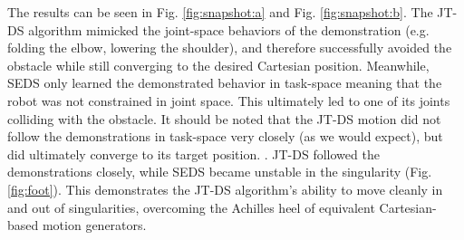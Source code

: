 \documentclass[letterpaper, 10 pt, conference,fleqn]{ieeeconf}
\begin{document}
The results can be seen in Fig. \ref{fig:snapshot:a} and Fig. \ref{fig:snapshot:b}. The JT-DS algorithm mimicked the joint-space behaviors of the demonstration (e.g. folding the elbow, lowering the shoulder), and therefore successfully avoided the obstacle while still converging to the desired Cartesian position. Meanwhile, SEDS only learned the demonstrated behavior in task-space meaning that the robot was not constrained in joint space. This ultimately led to one of its joints colliding with the obstacle. It should be noted that the JT-DS motion did not follow the demonstrations in task-space very closely (as we would expect), but did ultimately converge to its target position.
. JT-DS followed the demonstrations closely, while SEDS became unstable in the singularity (Fig. \ref{fig:foot}). This demonstrates the JT-DS algorithm's ability to move cleanly in and out of singularities, overcoming the Achilles heel of equivalent Cartesian-based motion generators.

\end{document}

